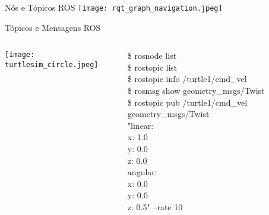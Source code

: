 \begin{frame}[t]{Nós e Tópicos ROS}
  \centering
  \texttt{[image: rqt\_graph\_navigation.jpeg]}
\end{frame}

\begin{frame}[t]{Tópicos e Mensagens ROS}

  \begin{columns}
    \hspace{.4cm}
    \texttt{[image: turtlesim\_circle.jpeg]} 
    

    \$ rosnode list
    \\\$ rostopic list
    \\\$ rostopic info /turtle1/cmd\_vel
    \\\$ rosmsg show geometry\_msgs/Twist
    \\\$ rostopic pub /turtle1/cmd\_vel geometry\_msgs/Twist 
      \\ \hspace{0.3cm} "linear:
      \\ \hspace{0.6cm}  x: 1.0
      \\ \hspace{0.6cm}  y: 0.0
      \\ \hspace{0.6cm}  z: 0.0
      \\ \hspace{0.3cm} angular:
      \\ \hspace{0.6cm}  x: 0.0
      \\ \hspace{0.6cm}  y: 0.0
      \\ \hspace{0.6cm}  z: 0.5" --rate 10

  \end{columns}

\end{frame}

